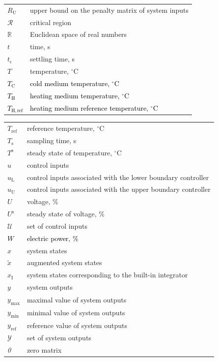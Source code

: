 \documentclass[preprint,12pt]{elsarticle}
\newcommand{\change}[1]{\textcolor{black}{#1}}
\begin{document}
\begin{tabular}{ l l }
			$R_{\mathrm{U}}$ & upper bound on the penalty matrix of system inputs \\
			$\mathcal{R}$ & critical region \\
			$\mathbb{R}$ & Euclidean space of real numbers \\
			$t$ & time, s \\
			$t_{\epsilon}$ & settling time, s \\
			$T$ & temperature, $^{\circ}\mathrm{C}$ \\
			\change{$T_{\mathrm{C}}$} & \change{cold medium temperature, $^{\circ}\mathrm{C}$} \\
			\change{$T_{\mathrm{H}}$} & \change{heating medium temperature, $^{\circ}\mathrm{C}$} \\
			\change{$T_{\mathrm{H, ref}}$} & \change{heating medium reference temperature, $^{\circ}\mathrm{C}$} \\			
		\end{tabular}
	
	
		\begin{tabular}{ l l }
			$T_{\mathrm{ref}}$ & reference temperature, $^{\circ}\mathrm{C}$ \\
			$T_{\mathrm{s}}$ & sampling time, s \\
			$T^{\mathrm{s}}$ & steady state of temperature, $^{\circ}\mathrm{C}$ \\
			$u$ & control inputs \\
			$u_{\mathrm{L}}$ & control inputs associated with the lower boundary controller\\
			$u_{\mathrm{U}}$ & control inputs associated with the upper boundary controller\\
			$U$ & voltage, \% \\
			$U^{\mathrm{s}}$ & steady state of voltage, \% \\
			$\mathcal{U}$ & set of control inputs \\
			\change{$W$} & \change{electric power, \%} \\			
			$x$ & system states \\
			$\widetilde{x}$ & augmented system states \\
			$x_{\mathrm{I}}$ & system states corresponding to the built-in integrator \\
			$y$ & system outputs \\
			$y_\mathrm{\max}$ & maximal value of system outputs \\
			$y_\mathrm{\min}$ & minimal value of system outputs \\
			$y_\mathrm{ref}$ & reference value of system outputs \\
			$\mathcal{Y}$ & set of system outputs \\
			\textit{0} & zero matrix
		\end{tabular}
	
\end{document}
